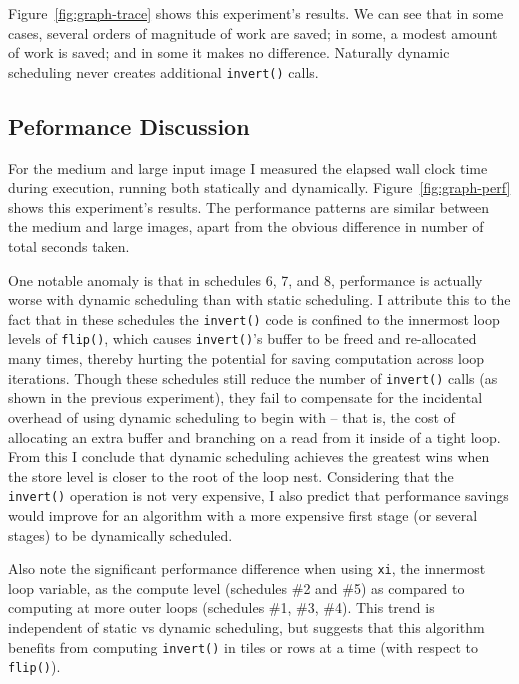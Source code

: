 \documentclass{article}
\begin{document}
Figure~\ref{fig:graph-trace} shows this experiment's results. We can see that in some cases, several orders of magnitude of work are saved; in some, a modest amount of work is saved; and in some it makes no difference. Naturally dynamic scheduling never creates additional \texttt{invert()} calls.

\subsection{Peformance Discussion}

For the medium and large input image I measured the elapsed wall clock time during execution, running both statically and dynamically. Figure~\ref{fig:graph-perf} shows this experiment's results. The performance patterns are similar between the medium and large images, apart from the obvious difference in number of total seconds taken.

One notable anomaly is that in schedules 6, 7, and 8, performance is actually worse with dynamic scheduling than with static scheduling. I attribute this to the fact that in these schedules the \texttt{invert()} code is confined to the innermost loop levels of \texttt{flip()}, which causes \texttt{invert()}'s buffer to be freed and re-allocated many times, thereby hurting the potential for saving computation across loop iterations.
Though these schedules still reduce the number of \texttt{invert()} calls (as shown in the previous experiment), they fail to compensate for the incidental overhead of using dynamic scheduling to begin with -- that is, the cost of allocating an extra buffer and branching on a read from it inside of a tight loop. From this I conclude that dynamic scheduling achieves the greatest wins when the store level is closer to the root of the loop nest. Considering that the \texttt{invert()} operation is not very expensive, I also predict that performance savings would improve for an algorithm with a more expensive first stage (or several stages) to be dynamically scheduled.

Also note the significant performance difference when using \texttt{xi}, the innermost loop variable, as the compute level (schedules \#2 and \#5) as compared to computing at more outer loops (schedules \#1, \#3, \#4). This trend is independent of static vs dynamic scheduling, but suggests that this algorithm benefits from computing \texttt{invert()} in tiles or rows at a time (with respect to \texttt{flip()}).

\end{document}
